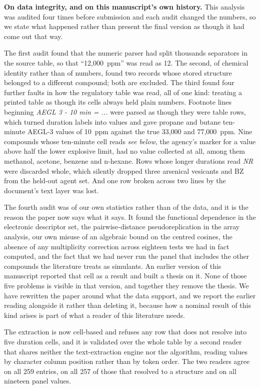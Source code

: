 \documentclass[11pt,a4paper]{article}
\begin{document}
\textbf{On data integrity, and on this manuscript's own history.} This analysis
was audited four times before submission and each audit changed the numbers, so
we state what happened rather than present the final version as though it had
come out that way.

The first audit found that the numeric parser had split thousands separators in
the source table, so that ``12,000~ppm'' was read as 12. The second, of chemical
identity rather than of numbers, found two records whose stored structure
belonged to a different compound; both are excluded. The third found four further
faults in how the regulatory table was read, all of one kind: treating a printed
table as though its cells always held plain numbers. Footnote lines beginning
\textit{AEGL 3 - 10 min = ...} were parsed as though they were table rows, which
turned duration labels into values and gave propane and butane ten-minute
AEGL-3 values of 10~ppm against the true 33,000 and 77,000~ppm. Nine compounds
whose ten-minute cell reads \textit{see below}, the agency's marker for a value
above half the lower explosive limit, had no value collected at all, among them
methanol, acetone, benzene and n-hexane. Rows whose longer durations read
\textit{NR} were discarded whole, which silently dropped three arsenical
vesicants and BZ from the held-out agent set. And one row broken across two lines
by the document's text layer was lost.

The fourth audit was of our own statistics rather than of the data, and it is the
reason the paper now says what it says. It found the functional dependence in the
electronic descriptor set, the pairwise-distance pseudoreplication in the array
analysis, our own misuse of an algebraic bound on the centred cosines, the
absence of any multiplicity
correction across eighteen tests we had in fact computed, and the fact that we had
never run the panel that includes the other compounds the literature treats as
simulants. An earlier version
of this manuscript reported that cell as a result and built a thesis on it. None
of those five problems is visible in that version, and together they remove the
thesis. We have rewritten the paper around what the data support, and we report
the earlier reading alongside it rather than deleting it, because how a nominal
result of this kind arises is part of what a reader of this literature needs.

The extraction is now cell-based and refuses any row that does not resolve into
five duration cells, and it is validated over the whole table by a second reader
that shares neither the text-extraction engine nor the algorithm, reading values
by character column position rather than by token order. The two readers agree on
all 259 entries, on all 257 of those that resolved to a structure and on all
nineteen panel values.
\end{document}
